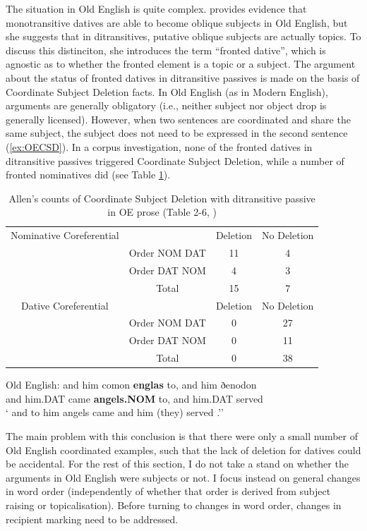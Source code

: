 	The situation in Old English is quite complex. \cite{Allen.1999} provides evidence that monotransitive datives are able to become oblique subjects in Old English, but she suggests that in ditransitives, putative oblique subjects are actually topics. To discuss this distinciton, she introduces the term ``fronted dative'', which is agnostic as to whether the fronted element is a topic or a subject. The argument about the status of fronted datives in ditransitive passives is made on the basis of Coordinate Subject Deletion facts. In Old English (as in Modern English), arguments are generally obligatory (i.e., neither subject nor object drop is generally licensed). However, when two sentences are coordinated and share the same subject, the subject does not need to be expressed in the second sentence (\ref{ex:OECSD}). In a corpus investigation, none of the fronted datives in ditransitive passives triggered Coordinate Subject Deletion, while a number of fronted nominatives did (see Table \ref{tab:AllenOECSD}). 

	\begin{table}[t]
		\begin{tabular}{cccc}
			Nominative Coreferential & & Deletion & No Deletion \\
			& Order NOM DAT & 11 & 4 \\
			& Order DAT NOM & 4 & 3 \\
			& Total & 15 & 7 \\
			\hline
			Dative Coreferential & & Deletion & No Deletion \\
			& Order NOM DAT & 0 & 27 \\
			& Order DAT NOM & 0 & 11 \\
			& Total & 0 & 38 \\
		\end{tabular}
		\caption{Allen's counts of Coordinate Subject Deletion with ditransitive passive in OE prose (Table 2-6, \citealt{Allen.1999})}
		\label{tab:AllenOECSD}
	\end{table}

	\begin{exe}
		\ex \label{ex:OECSD} Old English:
		\gll and him comon \textbf{englas} to, and him ðenodon\\
		and him.DAT came \textbf{angels.NOM} to, and him.DAT served\\
		\trans ` and to him angels came and him (they) served \citep[ex. 34]{Allen.1999}.''
	\end{exe}

	The main problem with this conclusion is that there were only a small number of Old English coordinated examples, such that the lack of deletion for datives could be accidental. For the rest of this section, I do not take a stand on whether the arguments in Old English were subjects or not. I focus instead on general changes in word order (independently of whether that order is derived from subject raising or topicalisation). Before turning to changes in word order, changes in recipient marking need to be addressed.

